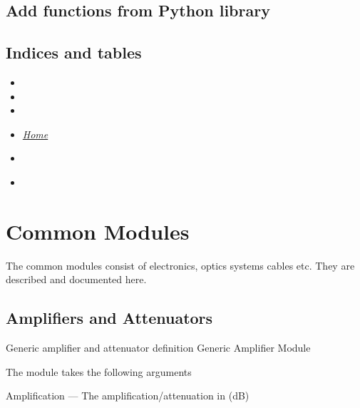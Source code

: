 \documentclass[letterpaper,10pt,english]{sphinxmanual}
\begin{document}
\subsection{Add functions from Python library}
\label{device_modules:add-functions-from-python-library}
\href{https://docs.python.org/library/io.html\#io.open}{}


\subsection{Indices and tables}
\label{device_modules:indices-and-tables}\begin{itemize}
\item {} 

\item {} 

\item {} 

\item {} 
{\hyperref[index::doc]{\emph{\emph{Home}}}}

\item {} 
{\hyperref[index:index-label]{\emph{}}}

\item {} 
{\hyperref[beam:beam-label]{\emph{}}}

\end{itemize}


\section{Common Modules}
\label{common_modules:common-modules}\label{common_modules::doc}
The common modules consist of electronics, optics systems cables etc. They are described and documented here.


\subsection{Amplifiers and Attenuators}
\label{common_modules:amplifiers-and-attenuators}
Generic amplifier and attenuator definition
\label{common_modules:module-AmpAttModule}
Generic Amplifier Module

The module takes the following arguments

Amplification --- The amplification/attenuation in (dB)
\end{document}
